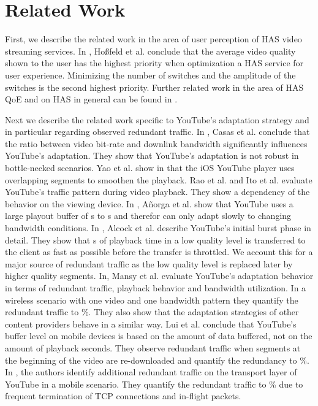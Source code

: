
\section{Related Work}
\label{sec:relatedwork}

First, we describe the related work in the area of user perception of HAS video streaming services.
In \cite{hossfeld2015identifyingqoeoptimal, hossfeld14assessingeffect}, Hoßfeld et al. conclude that the average video quality shown to the user has the highest priority when optimization a HAS service for user experience.
Minimizing the number of switches and the amplitude of the switches is the second highest priority.
Further related work in the area of HAS QoE and on HAS in general can be found in \cite{seufert2015survey}.

Next we describe the related work specific to YouTube's adaptation strategy and in particular regarding observed redundant traffic.
In \cite{casas2012youtube}, Casas et al. conclude that the ratio between video bit-rate and downlink bandwidth significantly influences YouTube's adaptation. 
They show that YouTube's adaptation is not robust in bottle-necked scenarios.
Yao et al. show in \cite{Yao2014b} that the iOS YouTube player uses overlapping segments to smoothen the playback.
Rao et al. \cite{rao2011network} and Ito et al. \cite{ito14networklevel} evaluate YouTube's traffic pattern during video playback. They show a dependency of the behavior on the viewing device.
In \cite{Anorga2015}, A\~norga et al. show that YouTube uses a large playout buffer of \unit[13]{s} to \unit[40]{s} and therefor can only adapt slowly to changing bandwidth conditions.
In \cite{alcock11application}, Alcock et al. describe YouTube's initial burst phase in detail. They show that \unit[32]{s} of playback time in a low quality level is transferred to the client as fast as possible before the transfer is throttled. We account this for a major source of redundant traffic as the low quality level is replaced later by higher quality segments.
In, \cite{Mansy2014} Mansy et al. evaluate YouTube's adaptation behavior in terms of redundant traffic, playback behavior and bandwidth utilization. In a wireless scenario with one video and one bandwidth pattern they quantify the redundant traffic to \unit[16]{\%}. They also show that the adaptation strategies of other content providers behave in a similar way.
Lui et al. \cite{liu2013comparative} conclude that YouTube's buffer level on mobile devices is based on the amount of data buffered, not on the amount of playback seconds. They observe redundant traffic when segments at the beginning of the video are re-downloaded and quantify the redundancy to \unit[15]{\%}.
In \cite{nam2013mobile}, the authors identify additional redundant traffic on the transport layer of YouTube in a mobile scenario. They quantify the redundant traffic to \unit[35]{\%} due to frequent termination of TCP connections and in-flight packets.

